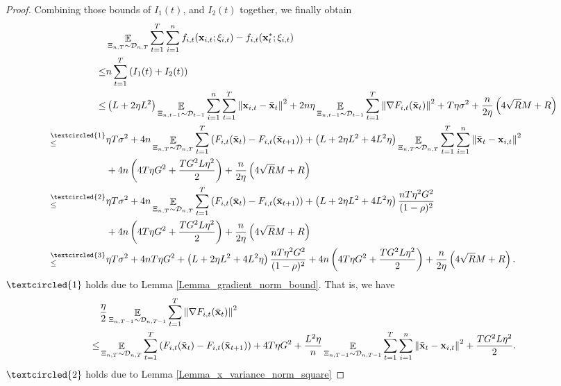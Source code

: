 \documentclass{article}
\begin{document}
\begin{proof}
 
Combining those bounds of $I_1(t)$, and $I_2(t)$ together, we finally obtain
\begin{align}
\nonumber
& \EE_{ \Xi_{n,T} \sim \Dcal_{n,T} } \sum_{t=1}^T\sum_{i=1}^n f_{i,t}(\x_{i,t};\xi_{i,t}) - f_{i,t}(\x_t^\ast;\xi_{i,t}) \\ \nonumber
\le & n \sum_{t=1}^T \lrincir{ I_1(t) + I_2(t) } \\ \nonumber
\le & \lrincir{ L + 2\eta L^2 }\EE_{ \Xi_{n,t-1} \sim \Dcal_{t-1} }\sum_{i=1}^n\sum_{t=1}^T\lrnorm{\x_{i,t} - \bar{\x}_t }^2   + 2n\eta  \EE_{ \Xi_{n,t-1} \sim \Dcal_{t-1} }\sum_{t=1}^T\lrnorm{\nabla F_{i,t}(\bar{\x}_t)}^2 + T\eta  \sigma^2  + \frac{n}{2\eta}\lrincir{ 4\sqrt{R}M + R  } \\ \nonumber
\refabovecir{\le}{\textcircled{1}} & \eta T \sigma^2 + 4n \EE_{ \Xi_{n,T} \sim \Dcal_{n,T} } \sum_{t=1}^T  \lrincir{F_{i,t}(\bar{\x}_t) - F_{i,t}(\bar{\x}_{t+1})}  +  \lrincir{L + 2\eta L^2  + 4L^2 \eta}  \EE_{ \Xi_{n,T} \sim \Dcal_{n,T} }\sum_{t=1}^T\sum_{i=1}^n \lrnorm{ \bar{\x}_t - \x_{i,t} }^2  \\ \nonumber
& + 4n \lrincir{ 4T  \eta G^2 + \frac{TG^2L\eta^2}{2} }  + \frac{n}{2\eta}\lrincir{ 4\sqrt{R}M + R  }\\ \nonumber
\refabovecir{\le}{\textcircled{2}} & \eta T \sigma^2 + 4n \EE_{ \Xi_{n,T} \sim \Dcal_{n,T} } \sum_{t=1}^T  \lrincir{F_{i,t}(\bar{\x}_t) - F_{i,t}(\bar{\x}_{t+1})}  +  \lrincir{ L + 2\eta L^2  + 4L^2 \eta}  \frac{nT\eta^2 G^2 }{(1-\rho)^2}  \\ \nonumber
& + 4n \lrincir{ 4T  \eta G^2 + \frac{TG^2L\eta^2}{2} }  + \frac{n}{2\eta}\lrincir{ 4\sqrt{R}M + R  } \\ \nonumber
\refabovecir{\le}{\textcircled{3}} & \eta T \sigma^2 + 4n  T\eta G^2  + \lrincir{ L + 2\eta L^2  + 4L^2 \eta}  \frac{nT\eta^2 G^2 }{(1-\rho)^2}  + 4n\lrincir{ 4T  \eta G^2 + \frac{TG^2L\eta^2}{2} }  + \frac{n}{2\eta}\lrincir{ 4\sqrt{R}M + R  }.
\end{align}  
$\textcircled{1}$ holds due to Lemma \ref{Lemma_gradient_norm_bound}. That is, we have
\begin{align}
\nonumber
& \frac{\eta}{2} \mathop{\mathbb{E}}_{ \Xi_{n,T-1} \sim \mathcal{D}_{n,T-1} }\sum_{t=1}^T \left\lVert\nabla F_{i,t}(\bar{{\bf x}}_t)\right\rVert^2 \\ \nonumber
\le & \mathop{\mathbb{E}}_{ \Xi_{n,T} \sim \mathcal{D}_{n,T} } \sum_{t=1}^T  \left( F_{i,t}(\bar{{\bf x}}_t) - F_{i,t}(\bar{{\bf x}}_{t+1}) \right) + 4T  \eta G^2 + \frac{ L^2 \eta}{n}\mathop{\mathbb{E}}_{ \Xi_{n,T-1} \sim \mathcal{D}_{n,T-1} }\sum_{t=1}^T\sum_{i=1}^n \left\lVert \bar{{\bf x}}_t - {\bf x}_{i,t} \right\rVert^2 + \frac{TG^2L\eta^2}{2}.
\end{align} $\textcircled{2}$ holds due to Lemma \ref{Lemma_x_variance_norm_square}

\end{proof}
\end{document}
